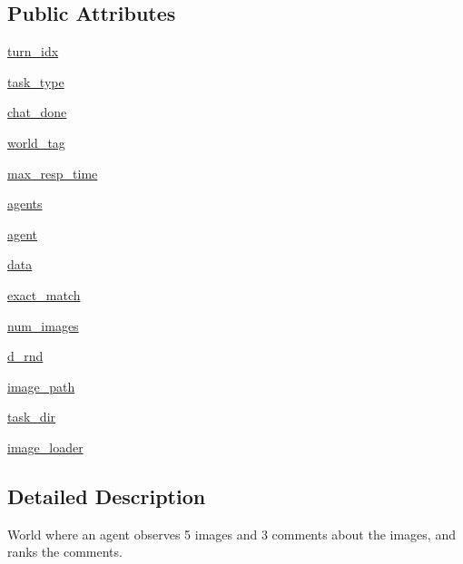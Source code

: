 \subsection*{Public Attributes}
\begin{DoxyCompactItemize}
\item 
\hyperlink{classigc__evals_1_1worlds_1_1MTurkIGCEvalWorld_a3bcc7bb6425e13848844cbb318503685}{turn\+\_\+idx}
\item 
\hyperlink{classigc__evals_1_1worlds_1_1MTurkIGCEvalWorld_ab893bcfbc17987bd7512731901791dd3}{task\+\_\+type}
\item 
\hyperlink{classigc__evals_1_1worlds_1_1MTurkIGCEvalWorld_ad9ae8b1e6e745aad24b2822fb19a7a85}{chat\+\_\+done}
\item 
\hyperlink{classigc__evals_1_1worlds_1_1MTurkIGCEvalWorld_a71ee5ba95de2b115ad926db20bf88ae4}{world\+\_\+tag}
\item 
\hyperlink{classigc__evals_1_1worlds_1_1MTurkIGCEvalWorld_aa203efe5c124b3400572cadb57a3774f}{max\+\_\+resp\+\_\+time}
\item 
\hyperlink{classigc__evals_1_1worlds_1_1MTurkIGCEvalWorld_af9ffc523ad51ee58a30f5b9ddee453be}{agents}
\item 
\hyperlink{classigc__evals_1_1worlds_1_1MTurkIGCEvalWorld_a2d85992a36e835c15f629b2ad0cd098d}{agent}
\item 
\hyperlink{classigc__evals_1_1worlds_1_1MTurkIGCEvalWorld_a074e88bda6e2160158b247b1a6d41a7d}{data}
\item 
\hyperlink{classigc__evals_1_1worlds_1_1MTurkIGCEvalWorld_adba95a00457b873e53ea8e78029c63f9}{exact\+\_\+match}
\item 
\hyperlink{classigc__evals_1_1worlds_1_1MTurkIGCEvalWorld_a74353f0142ea14589f660799b33aec27}{num\+\_\+images}
\item 
\hyperlink{classigc__evals_1_1worlds_1_1MTurkIGCEvalWorld_a217e4c01c668988579b89568f8d240fd}{d\+\_\+rnd}
\item 
\hyperlink{classigc__evals_1_1worlds_1_1MTurkIGCEvalWorld_a3ef9075020f751d5e24f99c9f26007b3}{image\+\_\+path}
\item 
\hyperlink{classigc__evals_1_1worlds_1_1MTurkIGCEvalWorld_a2c16cf5673b1546b5a87d74f1bfdc486}{task\+\_\+dir}
\item 
\hyperlink{classigc__evals_1_1worlds_1_1MTurkIGCEvalWorld_ab7440083f9c0ff4759784d4e54c1d8d8}{image\+\_\+loader}
\end{DoxyCompactItemize}


\subsection{Detailed Description}
\begin{DoxyVerb}World where an agent observes 5 images and 3 comments about the images, and ranks
the comments.
\end{DoxyVerb}
 

